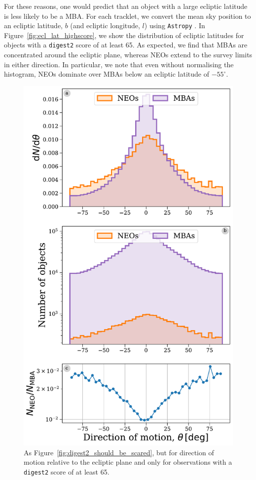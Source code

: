 \documentclass[preprint2, twocolappendix]{aastex631}
\newcommand{\dig}{\texttt{digest2}}
\begin{document}
For these reasons, one would predict that an object with a large ecliptic latitude is less likely to be a MBA. For each tracklet, we convert the mean sky position to an ecliptic latitude, $b$ (and ecliptic longitude, $l$) using \texttt{Astropy} \citep{astropy:2013,astropy:2018,astropy:2022}. In Figure~\ref{fig:ecl_lat_highscore}, we show the distribution of ecliptic latitudes for objects with a \dig{} score of at least 65. As expected, we find that MBAs are concentrated around the ecliptic plane, whereas NEOs extend to the survey limits in either direction. In particular, we note that even without normalising the histogram, NEOs dominate over MBAs below an ecliptic latitude of $-55^{\circ}$.

\begin{figure}[htb]
    \centering
    \includegraphics[width=\columnwidth]{figures/direction_dist_highscore.pdf}
    \caption{As Figure~\ref{fig:digest2_should_be_scared}, but for direction of motion relative to the ecliptic plane and only for observations with a \dig{} score of at least 65.}
    \label{fig:dir_highscore}
\end{figure}
\end{document}
